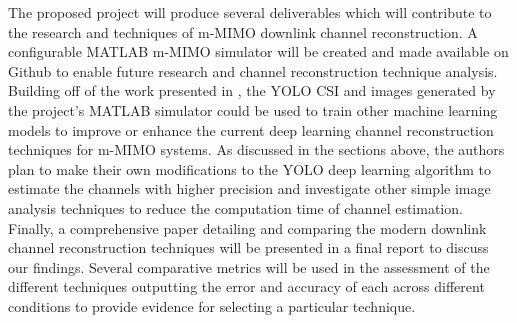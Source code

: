 \iffalse
\begin{enumerate}
    \item m-MIMO FDD OFDM MATLAB Simulation and code
    \begin{itemize}
        \item Simulation able to simulate a Base Station (BS) with a m-MIMO antenna system one or more UE connected to it
        \item Generate and save the necessary CSI for the downlink channel
        \item Generate labelled CSI and YOLO image data for deep learning training
        \item Change between different downlink channel reconstruction techniques
    \end{itemize}
    \item Introduce a new deep learning technique for extracting the paths from the YOLO channel images
    \item Investigate alternative approaches for extracting bright spots in images using simple coloured image analysis techniques
    \item Production of a comprehensive paper comparing the different channel reconstruction techniques using several comparative metrics and including necessary background and discussion of results
\end{enumerate}
\fi

The proposed project will produce several deliverables which will contribute to the research and techniques of m-MIMO downlink channel reconstruction. A  configurable MATLAB m-MIMO simulator will be created and made available on Github to enable future research and channel reconstruction technique analysis. Building off of the work presented in \cite{Li2020}, the YOLO CSI and images generated by the project's MATLAB simulator could be used to train other machine learning models to improve or enhance the current deep learning channel reconstruction techniques for m-MIMO systems. As discussed in the sections above, the authors plan to make their own modifications to the YOLO deep learning algorithm to estimate the channels with higher precision and investigate other simple image analysis techniques to reduce the computation time of channel estimation. Finally, a comprehensive paper detailing and comparing the modern downlink channel reconstruction techniques will be presented in a final report to discuss our findings. Several comparative metrics will be used in the assessment of the different techniques outputting the error and accuracy of each across different conditions to provide evidence for selecting a particular technique.